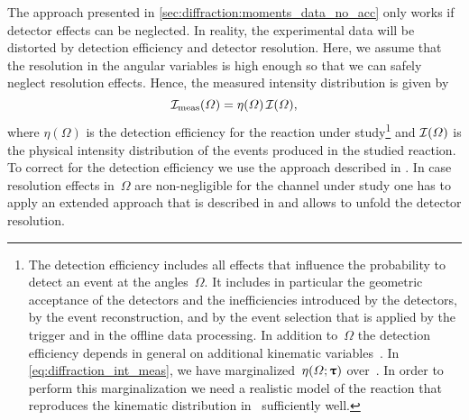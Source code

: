 The approach presented in \cref{sec:diffraction:moments_data_no_acc}
only works if detector effects can be neglected.  In reality, the
experimental data will be distorted by detection efficiency and
detector resolution.  Here, we assume that the resolution in the
angular variables is high enough so that we can safely neglect
resolution effects.  Hence, the measured intensity distribution is
given by
\begin{equation}
  \label{eq:diffraction_int_meas}
  \mathcal{I}_\text{meas}(\Omega)
  = \eta(\Omega)\, \mathcal{I}(\Omega),
\end{equation}
where $\eta(\Omega)$ is the detection efficiency for the reaction
under study\footnote{The detection efficiency includes all effects
that influence the probability to detect an event at the
angles~$\Omega$.  It includes in particular the geometric acceptance
of the detectors and the inefficiencies introduced by the detectors,
by the event reconstruction, and by the event selection that is
applied by the trigger and in the offline data processing.  In
addition to~$\Omega$ the detection efficiency depends in general on
additional kinematic variables~\vect{\uptau}.  In
\cref{eq:diffraction_int_meas}, we have marginalized~$\eta(\Omega;
\bm{\mathrm{\uptau}})$ over~\vect{\uptau}.  In order to perform this
marginalization we need a realistic model of the reaction that
reproduces the kinematic distribution in~\vect{\uptau} sufficiently
well.} and $\mathcal{I}(\Omega)$ is the physical intensity distribution
of the events produced in the studied reaction.  To correct for the
detection efficiency we use the approach described in
.
In case resolution effects in~$\Omega$ are non-negligible for the
channel under study one has to apply an extended approach that is
described in 
and allows to unfold the detector resolution.

